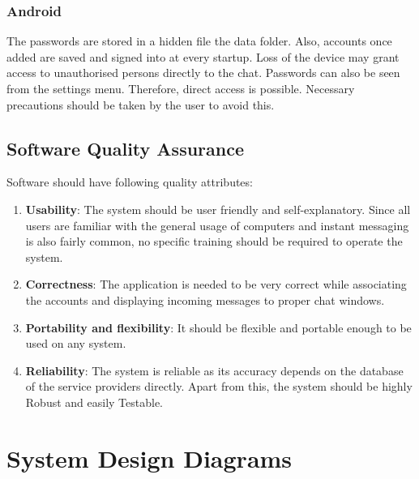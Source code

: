 \documentclass{SureshLimkar}
\begin{document}
\subsubsection{Android}
\hspace{0.5 in}The passwords are stored in a hidden file the data folder. Also, accounts once added are saved and signed into at every startup. Loss of the device may grant access to unauthorised persons directly to the chat. Passwords can also be seen from the settings menu. Therefore, direct access is possible. Necessary precautions should be taken by the user to avoid this.

\subsection{Software Quality Assurance}
Software should have following quality attributes:
\begin{enumerate}
	\item {\textbf{Usability}: The system should be user friendly and self-explanatory. Since all users are familiar with the general usage of computers and instant messaging is also fairly common, no specific training should be required to operate the system.}
	\item{\textbf{Correctness}: The application is needed to be very correct while associating the accounts and displaying incoming messages to proper chat windows.}
	\item{\textbf{Portability and flexibility}: It should be flexible and portable enough to be used on any system.}
	\item{\textbf{Reliability}: The system is reliable as its accuracy depends on the database of the service providers directly. Apart from this, the system should be highly Robust and easily Testable.}
\end{enumerate}
\newpage

\section{System Design Diagrams}

\end{document}
